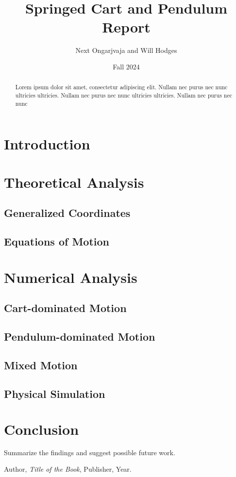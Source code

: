 \documentclass[12pt]{article}
\title{Springed Cart and Pendulum Report}
\author{Next Ongarjvaja and Will Hodges}
\date{Fall 2024}
\begin{document}
\maketitle

\begin{abstract}
    Lorem ipsum dolor sit amet, consectetur adipiscing elit. Nullam nec purus nec nunc ultricies ultricies. Nullam nec purus nec nunc ultricies ultricies. Nullam nec purus nec nunc
\end{abstract}

\tableofcontents

\section{Introduction}

\section{Theoretical Analysis}
\subsection{Generalized Coordinates}
\subsection{Equations of Motion}

\section{Numerical Analysis}
\subsection{Cart-dominated Motion}
\subsection{Pendulum-dominated Motion}
\subsection{Mixed Motion}
\subsection{Physical Simulation}

\section{Conclusion}
Summarize the findings and suggest possible future work.

\begin{thebibliography}{9}
    Author, \textit{Title of the Book}, Publisher, Year.
\end{thebibliography}
\end{document}
